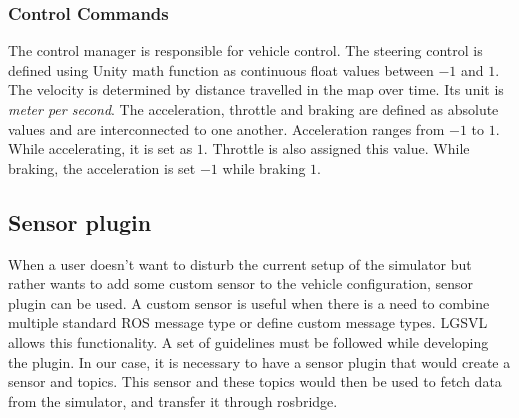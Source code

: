 \subsubsection*{Control Commands}
The control manager is responsible for vehicle control. The steering control is defined
using Unity math function as continuous float values between $-1$ and $1$. The velocity is
determined by distance travelled in the map over time. Its unit is \textit{meter per
second}. The acceleration, throttle and braking are defined as absolute values and are
interconnected to one another. Acceleration ranges from $-1$ to $1$. While accelerating,
it is set as $1$. Throttle is also assigned this value. While braking, the acceleration is
set $-1$ while braking $1$.

\iffalse
\subsection{Radar Sensor}
Since data fusion is one of the goals of the thesis, using a radar sensor would provide
important depth information. However, in LGSVL, in its current version, the radar sensor is not working as
required. This necessitates some changes to some of the files in the LGSVL code base.
This process involves -
\begin{enumerate}
    \item Correcting the already existing radar sensor code to detect traffic properly and
        assign the data to their variables that look similar to ROS custom message standards.
    \item Converting the LGSVL data to ROS understandable  custom message formats.
    \item Adding ROS2 as the bridge type to establish between client and LGSVL.
    \item On the client side, editing the docker to include custom radar message types.
\end{enumerate}
\fi

\subsection{Sensor plugin}
When a user doesn't want to disturb the current setup of the simulator but rather wants to add
some custom sensor to the vehicle configuration, sensor plugin can be used.  A custom sensor is useful when there is a need to combine multiple standard ROS
message type or define custom message types. LGSVL allows this functionality. A set of guidelines must be followed while developing the plugin. In our case,
it is necessary to have a sensor plugin that would create a sensor and topics. This sensor
and these topics would then be used to fetch data from the simulator, and transfer it
through rosbridge.

